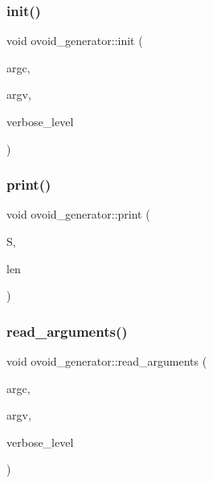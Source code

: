 \mbox{\label{classovoid__generator_a44d90a4751554076f432f35089a964c2}} 
\subsubsection{\texorpdfstring{init()}{init()}}
{\footnotesize\ttfamily void ovoid\+\_\+generator\+::init (\begin{DoxyParamCaption}\item[{int}]{argc,  }\item[{const char $\ast$$\ast$}]{argv,  }\item[{\mbox{\hyperlink{galois_8h_a09fddde158a3a20bd2dcadb609de11dc}{I\+NT}} \&}]{verbose\+\_\+level }\end{DoxyParamCaption})}

\mbox{\label{classovoid__generator_a59cd12f63826ba9810f303e898aae264}} 
\subsubsection{\texorpdfstring{print()}{print()}}
{\footnotesize\ttfamily void ovoid\+\_\+generator\+::print (\begin{DoxyParamCaption}\item[{\mbox{\hyperlink{galois_8h_a09fddde158a3a20bd2dcadb609de11dc}{I\+NT}} $\ast$}]{S,  }\item[{\mbox{\hyperlink{galois_8h_a09fddde158a3a20bd2dcadb609de11dc}{I\+NT}}}]{len }\end{DoxyParamCaption})}

\mbox{\label{classovoid__generator_a85df34db52d1f49f1f9c60dfdbf87040}} 
\subsubsection{\texorpdfstring{read\+\_\+arguments()}{read\_arguments()}}
{\footnotesize\ttfamily void ovoid\+\_\+generator\+::read\+\_\+arguments (\begin{DoxyParamCaption}\item[{int}]{argc,  }\item[{const char $\ast$$\ast$}]{argv,  }\item[{\mbox{\hyperlink{galois_8h_a09fddde158a3a20bd2dcadb609de11dc}{I\+NT}} \&}]{verbose\+\_\+level }\end{DoxyParamCaption})}

